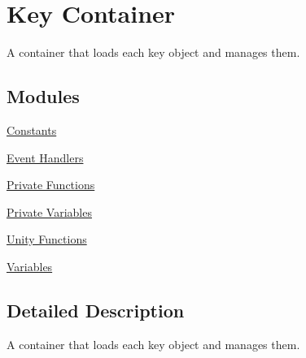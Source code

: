 \hypertarget{group___doc_key_contain}{}\section{Key Container}
\label{group___doc_key_contain}


A container that loads each key object and manages them.  


\subsection*{Modules}
\begin{DoxyCompactItemize}
\item 
\hyperlink{group___key_contain_const}{Constants}
\item 
\hyperlink{group___key_contain_handlers}{Event Handlers}
\item 
\hyperlink{group___key_contain_priv_func}{Private Functions}
\item 
\hyperlink{group___key_contain_priv_var}{Private Variables}
\item 
\hyperlink{group___key_contain_unity}{Unity Functions}
\item 
\hyperlink{group___key_contain_pub_var}{Variables}
\end{DoxyCompactItemize}


\subsection{Detailed Description}
A container that loads each key object and manages them. 

